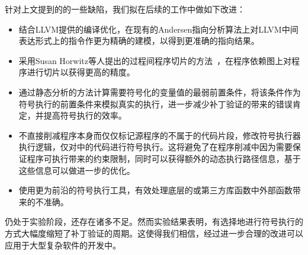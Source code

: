 针对上文提到的\dryrun 的一些缺陷，我们拟在后续的工作中做如下改进：
\begin{itemize}
\item 结合LLVM提供的编译优化，在现有的Andersen指向分析算法上对LLVM中间表达形式上的指令作更为精确的建模，以得到更准确的指向结果。
\item 采用Susan Horwitz等人提出的过程间程序切片的方法~，在程序依赖图上对程序进行切片以获得更高的精度。
\item 通过静态分析的方法计算需要符号化的变量值的最弱前置条件，将该条件作为符号执行的前置条件来模拟真实的执行，进一步减少补丁验证的带来的错误肯定，并提高符号执行的效率。
\item 不直接削减程序本身而仅仅标记源程序的不属于\rbscope 的代码片段，修改符号执行器执行逻辑，仅对\rbscope 中的代码进行符号执行。这将避免了在程序削减中因为需要保证程序可执行带来的约束限制，同时可以获得额外的动态执行路径信息，基于这些信息可以做进一步的优化。
\item 使用更为前沿的符号执行工具，有效处理底层的或第三方库函数中外部函数带来的不准确。
\end{itemize}

\dryrun 仍处于实验阶段，还存在诸多不足。然而实验结果表明，\dryrun 有选择地进行符号执行的方式大幅度缩短了补丁验证的周期。这使得我们相信，经过进一步合理的改进\dryrun 可以应用于大型复杂软件的开发中。